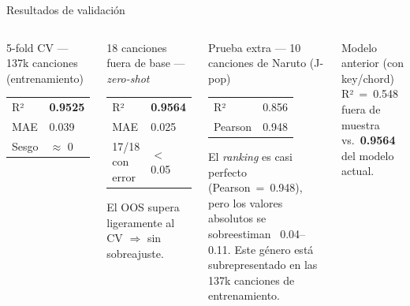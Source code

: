 \documentclass[aspectratio=169]{beamer}
\begin{document}
\begin{frame}{Resultados de validación}

  \begin{columns}
      \begin{block}{5-fold CV — 137k canciones (entrenamiento)}
        \begin{tabular}{ll}
          R²  & \textbf{0.9525} \\
          MAE & 0.039 \\
          Sesgo & $\approx$ 0 \\
        \end{tabular}
      \end{block}

      \bigskip
      \begin{block}{18 canciones fuera de base — \textit{zero-shot}}
        \begin{tabular}{ll}
          R²  & \textbf{0.9564} \\
          MAE & 0.025 \\
          17/18 con error & $<$ 0.05 \\
        \end{tabular}

        \medskip
        \small El OOS supera ligeramente al CV $\Rightarrow$ sin sobreajuste.
      \end{block}

      \begin{exampleblock}{Prueba extra — 10 canciones de Naruto (J-pop)}
        \begin{tabular}{ll}
          R²      & 0.856 \\
          Pearson & 0.948 \\
        \end{tabular}

        \medskip
        \small El \textit{ranking} es casi perfecto (Pearson~=~0.948), pero los valores absolutos se sobreestiman ~0.04--0.11. Este género está subrepresentado en las 137k canciones de entrenamiento.
      \end{exampleblock}

      \bigskip
      \begin{alertblock}{Modelo anterior (con key/chord)}
        \small R²~=~0.548 fuera de muestra vs.\ \textbf{0.9564} del modelo actual.
      \end{alertblock}
  \end{columns}

\end{frame}
\end{document}
